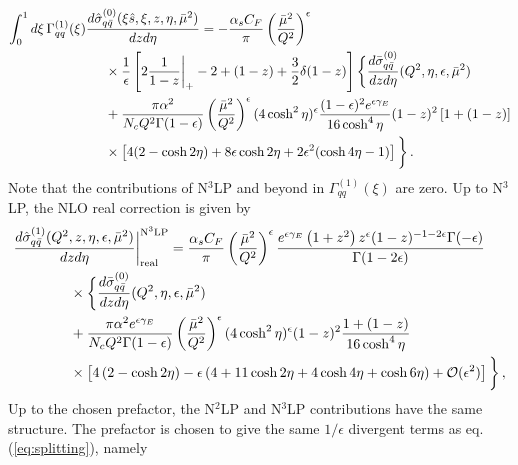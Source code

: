 \documentclass[11pt]{article}
\newcommand{\eps}{\epsilon}
\newcommand\eqn[1]     {eq.\,(\ref{#1})}
\begin{document}
\begin{align}\label{eq:NLOsubtractionnnnlp}
\int_0^1d\xi\,\Gamma_{qq}^{(1)}(\xi)\frac{d\hat{\sigma}_{q\bar{q}}^{(0)}(\xi\hat{s},\xi,z,\eta,\bar\mu^2)}{dzd\eta} &= -\frac{\alpha_sC_F}{\pi}\left(\frac{\bar\mu^2}{Q^2}\right)^{\epsilon}\nonumber \\
    &\hspace{-2.5cm}\times\frac{1}{\epsilon}\left[2\frac{1}{1-z}\bigg|_+-2+(1-z)+\frac{3}{2}\delta(1-z)\right] \bigg\{\frac{d\bar{\sigma}^{(0)}_{q\bar{q}}}{dzd\eta}(Q^2,\eta,\epsilon,\bar\mu^2)  \nonumber \\ 
    &\hspace{-2.5cm}+ \frac{\pi\alpha^2}{ N_c Q^2\Gamma(1-\epsilon)}\left(\frac{\bar\mu^2}{Q^2}\right)^{\epsilon}(4\cosh^2\eta)^{\epsilon}\frac{(1-\epsilon)^2e^{\eps\gamma_E}}{16\cosh^4\eta}(1-z)^2\left[1+(1-z)\right]\nonumber \\
    &\hspace{-2.5cm}\times\left[4(2-\cosh2\eta)+8\epsilon\cosh2\eta+2\epsilon^2(\cosh4\eta-1)\right]\bigg\}\,.
\end{align}
%
Note that the contributions of N$^3$LP and beyond in $\Gamma_{qq}^{(1)}(\xi)$ are zero. Up to N$^3$LP, the NLO real correction is given by
%
\begin{align}\label{eq:NLObarennnlp}
    \frac{d\hat{\sigma}_{q\bar{q}}^{(1)}(Q^2,z,\eta,\epsilon,\bar\mu^2)}{dzd\eta}\bigg|_{\text{real}}^{\text{N}^3\text{LP}}&= \frac{\alpha_sC_F}{\pi}\left(\frac{\bar\mu^2}{Q^2}\right)^{\epsilon}\frac{e^{\epsilon\gamma_E}\left(1+z^2\right)z^{\epsilon}(1-z)^{-1-2\epsilon}\Gamma(-\epsilon)}{\Gamma(1-2\epsilon)} \nonumber \\
    &\hspace{-2.5cm}\times\bigg\{\frac{d\bar{\sigma}^{(0)}_{q\bar{q}}}{dzd\eta}(Q^2,\eta,\epsilon,\bar\mu^2)  \nonumber \\ 
    &\hspace{-2.5cm}+ \frac{\pi\alpha^2e^{\epsilon\gamma_E}}{N_c Q^2\Gamma(1-\epsilon)}\left(\frac{\bar\mu^2}{Q^2}\right)^{\epsilon}(4\cosh^2\eta)^{\epsilon}(1-z)^2\frac{1+(1-z)}{16\cosh^4\eta}\nonumber \\
    &\hspace{-2.5cm}\times\left[4\left(2-\cosh2\eta\right)-\epsilon\left(4+11\cosh2\eta+4\cosh4\eta+\cosh6\eta\right)+\mathcal{O}(\epsilon^2)\right]\bigg\}\,,
\end{align}
%
Up to the chosen prefactor, the N$^2$LP and N$^3$LP contributions have the same structure. The prefactor is chosen to give the same  $1/\epsilon$ divergent terms as \eqn{eq:splitting}, namely
\end{document}

